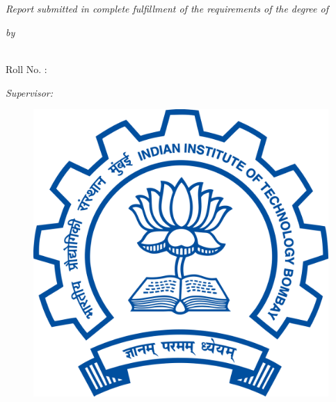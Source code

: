
\begin{titlepage}
		\begin{center}
			
			\HRule \\[0.4cm] %
			{\huge \bfseries \ttitle\par}\vspace{0.4cm} %
			\HRule \\[1.5cm] %
			
			\large \textit{Report submitted in complete fulfillment of the requirements of the degree of}
			\vspace{0.02\textwidth}
			\\ \degreename
			
			\vspace{0.06\textwidth}
			\textit{by}
			
			\vspace{0.06\textwidth}
			\textbf{\authorname}
			\vspace{0.02\textwidth}
			\\ Roll No. : \matnumber
			
			\vspace{0.06\textwidth}
			\textit{Supervisor:}
			\vspace{0.02\textwidth}
			\\ \supname
			
			\vspace{0.1\textwidth}
			\begin{figure}[H]
				\centering
				\includegraphics[scale=0.12]{Figures/iitb-logo}
			\end{figure}
			

\end{center}
\end{titlepage}

